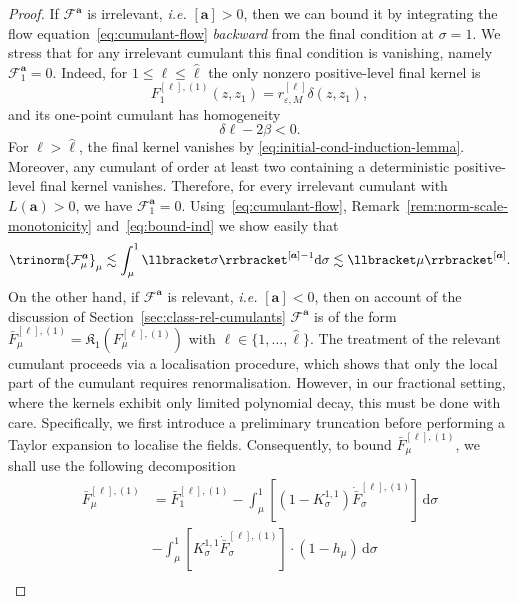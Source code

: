 \documentclass{article}
\numberwithin{equation}{section}
\newcommand{\mathd}{\mathrm{d}}
\theoremstyle{plain}
\theoremstyle{definition}
\begin{document}
\begin{proof}
  If $\mathcal{F}^{\boldsymbol{a}}$ is irrelevant, {\textit{i.e.}}
  $[\boldsymbol{a}] > 0$, then we can bound it by integrating the flow
  equation~\eqref{eq:cumulant-flow} \textit{backward} from the final
  condition at $\sigma = 1$. We stress that for any irrelevant cumulant this
  final condition is vanishing, namely $\mathcal{F}^{\boldsymbol{a}}_1 = 0$.
  Indeed, for $1 \leqslant \ell \leqslant \hat{\ell}$ the only nonzero
  positive-level final kernel is
  \[
    F_1^{[\ell], (1)}(z, z_1) = r^{[\ell]}_{\varepsilon, M} \delta (z, z_1),
  \]
  and its one-point cumulant has homogeneity
  \[
    \delta \ell - 2 \beta < 0.
  \]
  For $\ell > \hat{\ell}$, the final kernel vanishes by
  \eqref{eq:initial-cond-induction-lemma}. Moreover, any cumulant of order at
  least two containing a deterministic positive-level final kernel vanishes.
  Therefore, for every irrelevant cumulant with $L (\boldsymbol{a}) > 0$, we
  have $\mathcal{F}^{\boldsymbol{a}}_1 = 0$.
  Using~\eqref{eq:cumulant-flow}, Remark~\ref{rem:norm-scale-monotonicity}
  and~\eqref{eq:bound-ind} we show easily that
  \[ \trinorm{ \mathcal{F}^{\boldsymbol{a}}_{\mu} }_{\mu} \lesssim
     \int_{\mu}^1 \llbracket \sigma \rrbracket^{[\boldsymbol{a}] - 1} \mathd
     \sigma \lesssim \llbracket \mu \rrbracket^{[\boldsymbol{a}]} . \]
  On the other hand, if $\mathcal{F}^{\boldsymbol{a}}$ is relevant,
  {\textit{i.e.}} $[\boldsymbol{a}] < 0$, then on account of the discussion of
  Section~\ref{sec:class-rel-cumulants} $\mathcal{F}^{\boldsymbol{a}}$ is of the
  form $\bar{F}_{\mu}^{[\ell], (1)} =\mathfrak{K}_1 (F_{\mu}^{[\ell],(1)})$
  with $\ell \in \{ 1, \ldots, \hat{\ell} \}$. The treatment of the relevant
  cumulant proceeds via a localisation procedure, which shows that only the
  local part of the cumulant requires renormalisation. However, in our
  fractional setting, where the kernels exhibit only limited polynomial decay,
  this must be done with care. Specifically, we first introduce a preliminary
  truncation before performing a Taylor expansion to localise the fields.
  Consequently, to bound $\bar{F}_{\mu}^{[\ell], (1)}$, we shall use the
  following decomposition
  \begin{equation}
    \begin{aligned}
      \bar{F}_{\mu}^{[\ell], (1)} & = \bar{F}_1^{[\ell], (1)} - \int_{\mu}^1
      [(1 - K_{\sigma}^{1, 1}) \dot{\bar{F}}_{\sigma}^{[\ell], (1)}]\,\mathd
      \sigma \\ &- \int_{\mu}^1 [K^{1, 1}_{\sigma} \dot{\bar{F}}_{\sigma}^{[\ell],
      (1)}] \cdot (1 - h_{\mu})\,\mathd \sigma\\

\end{aligned}
\end{equation}
\end{proof}
\end{document}
